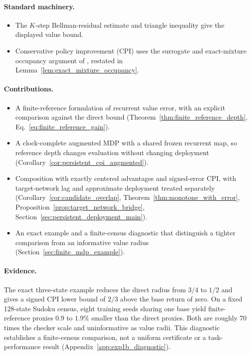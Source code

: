 \documentclass{article}
\theoremstyle{plain}
\theoremstyle{definition}
\theoremstyle{remark}
\begin{document}
\paragraph{Standard machinery.}
\begin{itemize}
\item The $K$-step Bellman-residual estimate and triangle inequality give
the displayed value bound.
\item Conservative policy improvement (CPI) uses the surrogate and
exact-mixture occupancy argument of \citet{KakadeLangford2002}, restated
in Lemma~\ref{lem:exact_mixture_occupancy}.
\end{itemize}

\paragraph{Contributions.}
\begin{itemize}
\item A finite-reference formulation of recurrent value error, with an
explicit comparison against the direct bound
(Theorem~\ref{thm:finite_reference_depth},
Eq.~\eqref{eq:finite_reference_gain}).
\item A clock-complete augmented MDP with a shared frozen recurrent map,
so reference depth changes evaluation without changing deployment
(Corollary~\ref{cor:persistent_cpi_augmented}).
\item Composition with exactly centered advantages and signed-error CPI,
with target-network lag and approximate deployment treated separately
(Corollary~\ref{cor:candidate_overlap},
Theorem~\ref{thm:monotone_with_error},
Proposition~\ref{prop:target_network_bridge},
Section~\ref{sec:persistent_deployment_main}).
\item An exact example and a finite-census diagnostic that distinguish
a tighter comparison from an informative value radius
(Section~\ref{sec:finite_mdp_example}).
\end{itemize}

\paragraph{Evidence.}
The exact three-state example reduces the direct radius from $3/4$ to
$1/2$ and gives a signed CPI lower bound of $2/3$ above the base return
of zero. On a fixed 128-state Sudoku census, eight training seeds sharing
one base yield finite-reference proxies $0.9$ to $1.9\%$ smaller than
the direct proxies. Both are roughly 70 times the checker scale and
uninformative as value radii. This diagnostic establishes a finite-census
comparison, not a uniform certificate or a task-performance result
(Appendix~\ref{app:exp1b_diagnostic}).
\end{document}
